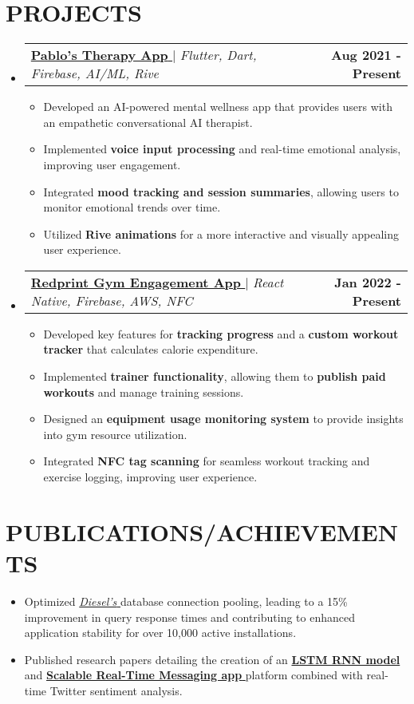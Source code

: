 \documentclass[letterpaper,10pt]{article}
\makeatletter
\newcommand{\resumeItem}[1]{
  \item\small{
    {#1 \vspace{-2pt}}
  }
}
\newcommand{\resumeProjectHeading}[2]{
  \item
    \begin{tabular*}{1.001\textwidth}{l@{\extracolsep{\fill}}r}
      \small#1 & \textbf{\small #2}\\
    \end{tabular*}\vspace{-7pt}
}
\newcommand{\resumeSubHeadingListStart}{\begin{itemize}[leftmargin=0.0in, label={}]}
\newcommand{\resumeSubHeadingListEnd}{\end{itemize}}
\newcommand{\resumeItemListStart}{\begin{itemize}}
\newcommand{\resumeItemListEnd}{\end{itemize}\vspace{-5pt}}
\makeatother
\begin{document}
\section{PROJECTS}
\resumeSubHeadingListStart
  \resumeProjectHeading {\href{https://github.com/yourusername/therapy-ai-app}{\textbf{\large{Pablo's Therapy App}} \href{https://github.com/yourusername/therapy-ai-app}{\raisebox{-0.1\height}\faExternalLink }} $|$ \textit{\normalsize{Flutter, Dart, Firebase, AI/ML, Rive}}}{Aug 2021 - Present}
  \resumeItemListStart
    \resumeItem{\normalsize{Developed an AI-powered mental wellness app that provides users with an empathetic conversational AI therapist.}}
    \resumeItem{\normalsize{Implemented \textbf{voice input processing} and real-time emotional analysis, improving user engagement.}}
    \resumeItem{\normalsize{Integrated \textbf{mood tracking and session summaries}, allowing users to monitor emotional trends over time.}}
    \resumeItem{\normalsize{Utilized \textbf{Rive animations} for a more interactive and visually appealing user experience.}}
  \resumeItemListEnd\vspace{-12pt}
  \resumeProjectHeading {\href{https://www.redprintfit.com/}{\textbf{\large{Redprint Gym Engagement App}} \href{https://www.redprintfit.com/}{\raisebox{-0.1\height}\faExternalLink }} $|$ \textit{\normalsize{React Native, Firebase, AWS, NFC}}}{Jan 2022 - Present}
  \resumeItemListStart
    \resumeItem{\normalsize{Developed key features for \textbf{tracking progress} and a \textbf{custom workout tracker} that calculates calorie expenditure.}}
    \resumeItem{\normalsize{Implemented \textbf{trainer functionality}, allowing them to \textbf{publish paid workouts} and manage training sessions.}}
    \resumeItem{\normalsize{Designed an \textbf{equipment usage monitoring system} to provide insights into gym resource utilization.}}
    \resumeItem{\normalsize{Integrated \textbf{NFC tag scanning} for seamless workout tracking and exercise logging, improving user experience.}}
  \resumeItemListEnd
\resumeSubHeadingListEnd
\vspace{-12pt}
\section{PUBLICATIONS/ACHIEVEMENTS}
\resumeItemListStart
\resumeItem{\normalsize{Optimized \href{https://github.com/diesel-rs/diesel}{\textit{Diesel's \raisebox{-0.1\height}\faExternalLink}}} database connection pooling, leading to a 15\% improvement in query response times and contributing to enhanced application stability for over 10,000 active installations.}
  \vspace{-4pt}
  \resumeItem{\normalsize{Published research papers detailing the creation of an \href{https://www.researchgate.net/publication/369430263_Stock_Market_Trend_Prediction_Along_with_Twitter_Sentiment_Analysis}{\textbf{LSTM RNN model \raisebox{-0.1\height}\faExternalLink}} and \href{https://www.ijraset.com/fileserve.php?FID=35305}{\textbf{Scalable Real-Time Messaging app \raisebox{-0.1\height}\faExternalLink}} platform combined with real-time Twitter sentiment analysis.}}
  \vspace{-4pt}
\resumeItemListEnd
\end{document}
